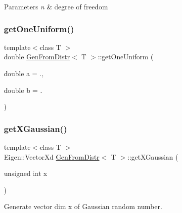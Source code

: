 \begin{DoxyParams}{Parameters}
{\em n} & degree of freedom \\
\hline
\end{DoxyParams}
\hypertarget{classGenFromDistr_a3e32f495d1e6dfa4b152980e8b6c233c}{}\label{classGenFromDistr_a3e32f495d1e6dfa4b152980e8b6c233c} 
\subsubsection{\texorpdfstring{get\+One\+Uniform()}{getOneUniform()}}
{\footnotesize\ttfamily template$<$class T $>$ \\
double \hyperlink{classGenFromDistr}{Gen\+From\+Distr}$<$ T $>$\+::get\+One\+Uniform (\begin{DoxyParamCaption}\item[{double}]{a = {.},  }\item[{double}]{b = {.} }\end{DoxyParamCaption})\hspace{0.3cm}{\ttfamily [inline]}}

\hypertarget{classGenFromDistr_a60a61050c09c5f40ad74869a7aa1a6c2}{}\label{classGenFromDistr_a60a61050c09c5f40ad74869a7aa1a6c2} 
\subsubsection{\texorpdfstring{get\+X\+Gaussian()}{getXGaussian()}}
{\footnotesize\ttfamily template$<$class T $>$ \\
Eigen\+::\+Vector\+Xd \hyperlink{classGenFromDistr}{Gen\+From\+Distr}$<$ T $>$\+::get\+X\+Gaussian (\begin{DoxyParamCaption}\item[{unsigned int}]{x }\end{DoxyParamCaption})\hspace{0.3cm}{\ttfamily [inline]}}



Generate vector dim x of Gaussian random number. 

\hypertarget{classGenFromDistr_a018afaad1a8ea5f4722a412629da610d}{}\label{classGenFromDistr_a018afaad1a8ea5f4722a412629da610d} 
